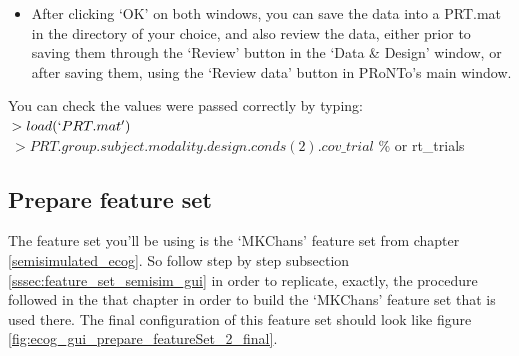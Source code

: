 \begin{itemize}
\begin{itemize}
\item The number of targets must correspond to the number of trials in each condition, including bad trials for MEEG data (hence the 73 instead of 60 and 56).
\item Multiple covariates can be entered in the form of a \# trials x \# covariates matrix. As the table can only display one line, the matrix is vectorised before display. This does not affect the matrix in the PRT structure.
\item For .mat or nifti formats, a file can be specified to fill in the whole table, instead of manually inputting the regression targets and the covariates. This file should contain the `names', `onsets' and `durations' variables (as in previous PRoNTo versions), as well as a `rt\_trial` and `R' cell arrays, with one cell per condition.
\end{itemize}

Please note that there is no need to specify a mask file for the MEEG modality type as all the useful information is already contained inside the MEEG file.

\item After clicking `OK' on both windows, you can save the data into a PRT.mat in the directory of your choice, and also review the data, either prior to saving them through the `Review' button in the `Data \& Design' window, or after saving them, using the `Review data' button in PRoNTo's main window.

\end{itemize}

\noindent You can check the values were passed correctly by typing:
\\

$\>> load(`PRT.mat')$
\\

$\>> PRT.group.subject.modality.design.conds(2).cov\_trial$ \% or rt\_trials


\subsection{Prepare feature set}

The feature set you'll be using is the `MKChans' feature set from chapter \ref{semisimulated_ecog}. So follow step by step subsection \ref{sssec:feature_set_semisim_gui} in order to replicate, exactly, the procedure followed in the that chapter in order to build the `MKChans' feature set that is used there.  The final configuration of this feature set should look like figure \ref{fig:ecog_gui_prepare_featureSet_2_final}.


